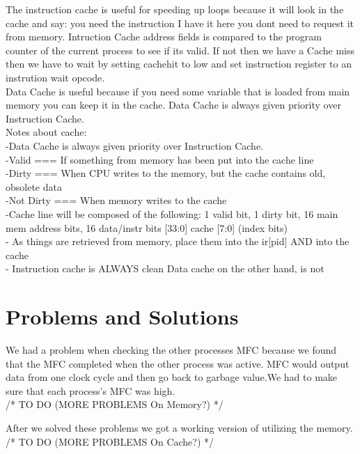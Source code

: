 \documentclass[12pt, twocolumn]{scrartcl}
\begin{document}
The instruction cache is useful for speeding up loops because it will look in the cache and say: you need the instruction I have it here you dont need to request it from memory. Intruction Cache address fields is compared to the program counter of the current process to see if its valid.  If not then we have a Cache miss then we have to wait by setting cachehit to low and set instruction register to an instrution wait opcode. \\

Data Cache is useful because if you need some variable that is loaded from main memory you can keep it in the cache.  Data Cache is always given priority over Instruction Cache.\\

Notes about cache: \\
-Data Cache is always given priority over Instruction Cache. \\
-Valid === If something from memory has been put into the cache line \\
-Dirty === When CPU writes to the memory, but the cache contains old, obsolete data \\
-Not Dirty === When memory writes to the cache \\
-Cache line will be composed of the following: {1 valid bit, 1 dirty bit, 16 main mem address bits, 16 data/instr bits} [33:0] cache [7:0] (index bits) \\
- As things are retrieved from memory, place them into the ir[pid] AND into the cache \\
- Instruction cache is ALWAYS clean Data cache on the other hand, is not \\


\section*{Problems and Solutions}
We had a problem when checking the other processes MFC because we found that the MFC completed when the other process was active.  MFC would output data from one clock cycle and then go back to garbage value.We had to make sure that each process's MFC was high.\\

/* TO DO (MORE PROBLEMS On Memory?) */ 

After we solved these problems we got a working version of utilizing the memory. \\

/* TO DO (MORE PROBLEMS On Cache?) */ 
\end{document}
